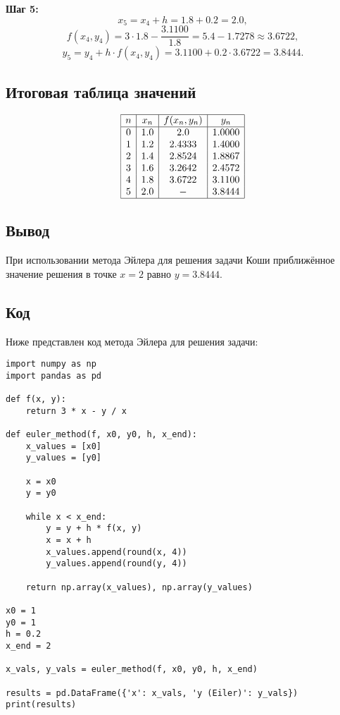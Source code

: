 \documentclass[a4paper,12pt]{article}
\begin{document}
\textbf{Шаг 5:}
\[
x_5 = x_4 + h = 1.8 + 0.2 = 2.0,
\]
\[
f(x_4, y_4) = 3 \cdot 1.8 - \frac{3.1100}{1.8} = 5.4 - 1.7278 \approx 3.6722,
\]
\[
y_5 = y_4 + h \cdot f(x_4, y_4) = 3.1100 + 0.2 \cdot 3.6722 = 3.8444.
\]

\subsection*{Итоговая таблица значений}

\[
\begin{array}{|c|c|c|c|}
\hline
n & x_n & f(x_n, y_n) & y_n \\ \hline
0 & 1.0 & 2.0 & 1.0000 \\ 
1 & 1.2 & 2.4333 & 1.4000 \\ 
2 & 1.4 & 2.8524 & 1.8867 \\ 
3 & 1.6 & 3.2642 & 2.4572 \\ 
4 & 1.8 & 3.6722 & 3.1100 \\ 
5 & 2.0 & - & 3.8444 \\ \hline
\end{array}
\]

\subsection*{Вывод}
При использовании метода Эйлера для решения задачи Коши приближённое значение решения в точке \( x = 2 \) равно \( y = 3.8444 \).



\subsection*{Код}
\par
Ниже представлен код метода Эйлера для решения задачи:

\begin{lstlisting}
import numpy as np
import pandas as pd

def f(x, y):
    return 3 * x - y / x

def euler_method(f, x0, y0, h, x_end):
    x_values = [x0]
    y_values = [y0]
    
    x = x0
    y = y0
    
    while x < x_end:
        y = y + h * f(x, y)
        x = x + h
        x_values.append(round(x, 4))  
        y_values.append(round(y, 4)) 
    
    return np.array(x_values), np.array(y_values)

x0 = 1   
y0 = 1    
h = 0.2   
x_end = 2 

x_vals, y_vals = euler_method(f, x0, y0, h, x_end)

results = pd.DataFrame({'x': x_vals, 'y (Eiler)': y_vals})
print(results)
\end{lstlisting}
\end{document}

